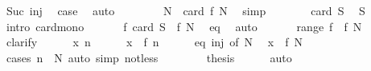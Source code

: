 \begin{isabellebody}
\ Suc\ inj\ \isamarkupfalse%
\ {\isacharquery}{\kern0pt}case\ \isamarkupfalse%
\ auto\isanewline
\ \ \isamarkupfalse%
\isanewline
\ \ \isamarkupfalse%
\ \isamarkupfalse%
\ {\isachardoublequoteopen}N\ {\isasymle}\ card\ {\isacharparenleft}{\kern0pt}f\ N{\isacharparenright}{\kern0pt}{\isachardoublequoteclose}\ \isamarkupfalse%
\ simp\isanewline
\ \ \isamarkupfalse%
\ \isamarkupfalse%
\ {\isachardoublequoteopen}{\isasymdots}\ {\isasymle}\ card\ S{\isachardoublequoteclose}\ \isamarkupfalse%
\ S\ \isamarkupfalse%
\ {\isacharparenleft}{\kern0pt}intro\ card{\isacharunderscore}{\kern0pt}mono{\isacharparenright}{\kern0pt}\isanewline
\ \ \isamarkupfalse%
\ \isamarkupfalse%
\ {\isasymsection}{\isacharcolon}{\kern0pt}\ {\isachardoublequoteopen}f\ {\isacharparenleft}{\kern0pt}card\ S{\isacharparenright}{\kern0pt}\ {\isacharequal}{\kern0pt}\ f\ N{\isachardoublequoteclose}\ \isamarkupfalse%
\ eq\ \isamarkupfalse%
\ auto\isanewline
\ \ \isamarkupfalse%
\ \isamarkupfalse%
\ {\isachardoublequoteopen}{\isasymUnion}\ {\isacharparenleft}{\kern0pt}range\ f{\isacharparenright}{\kern0pt}\ {\isasymsubseteq}\ f\ N{\isachardoublequoteclose}\isanewline
\ \ \isamarkupfalse%
\ clarify\isanewline
\ \ \ \ \isamarkupfalse%
\ x\ n\isanewline
\ \ \ \ \isamarkupfalse%
\ {\isachardoublequoteopen}x\ {\isasymin}\ f\ n{\isachardoublequoteclose}\isanewline
\ \ \ \ \isamarkupfalse%
\ eq\ inj\ {\isacharbrackleft}{\kern0pt}of\ N{\isacharbrackright}{\kern0pt}\ \isamarkupfalse%
\ {\isachardoublequoteopen}x\ {\isasymin}\ f\ N{\isachardoublequoteclose}\isanewline
\ \ \ \ \ \ \isamarkupfalse%
\ {\isacharparenleft}{\kern0pt}cases\ {\isachardoublequoteopen}n\ {\isacharless}{\kern0pt}\ N{\isachardoublequoteclose}{\isacharparenright}{\kern0pt}\ {\isacharparenleft}{\kern0pt}auto\ simp{\isacharcolon}{\kern0pt}\ not{\isacharunderscore}{\kern0pt}less{\isacharparenright}{\kern0pt}\isanewline
\ \ \isamarkupfalse%
\isanewline
\ \ \isamarkupfalse%
\ \isamarkupfalse%
\ {\isacharquery}{\kern0pt}thesis\isanewline
\ \ \ \ \isamarkupfalse%
\ auto\isanewline
{}\isamarkupfalse%
%
\endisatagproof
{\isafoldproof}%
%
\isadelimproof
%
\endisadelimproof
%
\isadelimdocument
%

\end{isabellebody}
